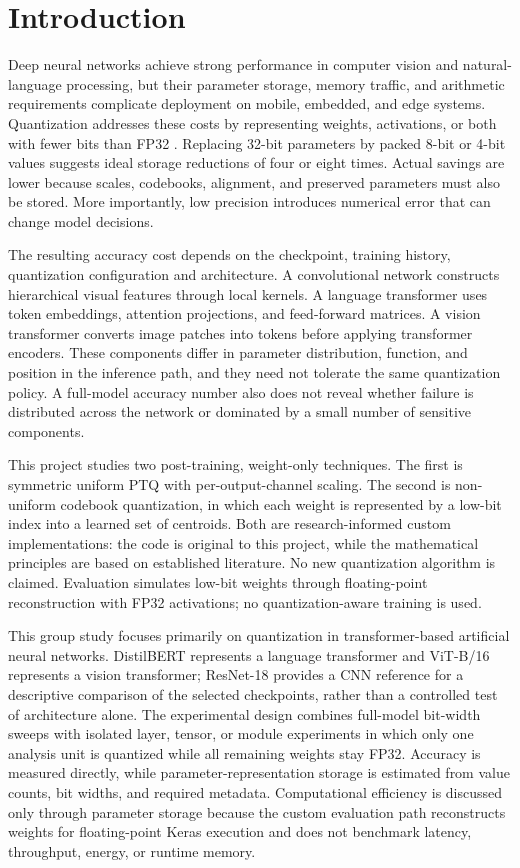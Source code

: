 \documentclass[conference]{IEEEtran}
\begin{document}
\section{Introduction}

Deep neural networks achieve strong performance in computer vision and natural-language processing, but their parameter storage, memory traffic, and arithmetic requirements complicate deployment on mobile, embedded, and edge systems. Quantization addresses these costs by representing weights, activations, or both with fewer bits than FP32 \cite{jacob2018,krishnamoorthi2018,nagel2021}. Replacing 32-bit parameters by packed 8-bit or 4-bit values suggests ideal storage reductions of four or eight times. Actual savings are lower because scales, codebooks, alignment, and preserved parameters must also be stored. More importantly, low precision introduces numerical error that can change model decisions.

The resulting accuracy cost depends on the checkpoint, training history, quantization configuration and architecture. A convolutional network constructs hierarchical visual features through local kernels. A language transformer uses token embeddings, attention projections, and feed-forward matrices. A vision transformer converts image patches into tokens before applying transformer encoders. These components differ in parameter distribution, function, and position in the inference path, and they need not tolerate the same quantization policy. A full-model accuracy number also does not reveal whether failure is distributed across the network or dominated by a small number of sensitive components.

This project studies two post-training, weight-only techniques. The first is symmetric uniform PTQ with per-output-channel scaling. The second is non-uniform codebook quantization, in which each weight is represented by a low-bit index into a learned set of centroids. Both are research-informed custom implementations: the code is original to this project, while the mathematical principles are based on established literature. No new quantization algorithm is claimed. Evaluation simulates low-bit weights through floating-point reconstruction with FP32 activations; no quantization-aware training is used.

This group study focuses primarily on quantization in transformer-based artificial neural networks. DistilBERT represents a language transformer and ViT-B/16 represents a vision transformer; ResNet-18 provides a CNN reference for a descriptive comparison of the selected checkpoints, rather than a controlled test of architecture alone. The experimental design combines full-model bit-width sweeps with isolated layer, tensor, or module experiments in which only one analysis unit is quantized while all remaining weights stay FP32. Accuracy is measured directly, while parameter-representation storage is estimated from value counts, bit widths, and required metadata. Computational efficiency is discussed only through parameter storage because the custom evaluation path reconstructs weights for floating-point Keras execution and does not benchmark latency, throughput, energy, or runtime memory.
\end{document}
